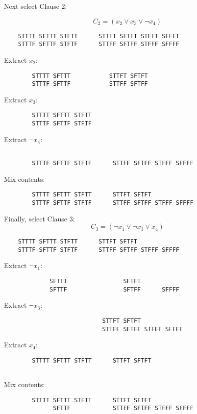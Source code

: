 Next select Clause 2:

\[
C_2 = (x_2 \vee x_3 \vee \neg x_4)
\]

\begin{verbatim}
	STTTT SFTTT STFTT      STTFT SFTFT STFFT SFFFT
	STTTF SFTTF STFTF      STTFF SFTFF STFFF SFFFF
\end{verbatim}		

	Extract $x_2$:
\begin{verbatim}
		STTTT SFTTT           STTFT SFTFT          
		STTTF SFTTF           STTFF SFTFF          
\end{verbatim}	

	Extract $x_3$:
\begin{verbatim}	
		STTTT SFTTT STFTT                         
		STTTF SFTTF STFTF                         
\end{verbatim}	

	Extract $\neg x_4$:
\begin{verbatim}
		                                       
		STTTF SFTTF STFTF      STTFF SFTFF STFFF SFFFF	
\end{verbatim}

	Mix contents:
\begin{verbatim}
		STTTT SFTTT STFTT      STTFT SFTFT          
		STTTF SFTTF STFTF      STTFF SFTFF STFFF SFFFF
\end{verbatim}

Finally, select Clause 3:	
\[
C_3 = (\neg x_1 \vee \neg x_3 \vee x_4)
\]
\begin{verbatim}
	STTTT SFTTT STFTT      STTFT SFTFT          
	STTTF SFTTF STFTF      STTFF SFTFF STFFF SFFFF
\end{verbatim}	
	Extract $\neg x_1$:
\begin{verbatim}
		     SFTTT                SFTFT          
		     SFTTF                SFTFF      SFFFF
\end{verbatim}

	Extract $\neg x_3$:
\begin{verbatim}
		                    STTFT SFTFT          
		                    STTFF SFTFF STFFF SFFFF
\end{verbatim}	

	Extract $x_4$:
\begin{verbatim}
		STTTT SFTTT STFTT      STTFT SFTFT          
		                                       
\end{verbatim}

	Mix contents:
\begin{verbatim}
		STTTT SFTTT STFTT      STTFT SFTFT          
		      SFTTF            STTFF SFTFF STFFF SFFFF
\end{verbatim}





